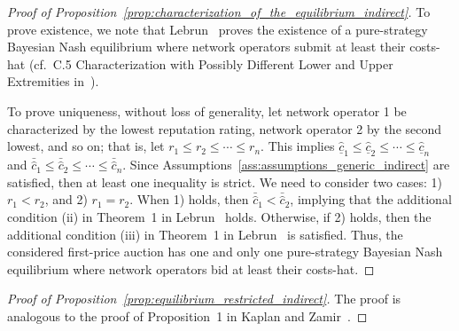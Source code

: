 \begin{proof}[Proof of Proposition~\ref{prop:characterization_of_the_equilibrium_indirect}]
To prove existence, we note that Lebrun~\cite{Lebrun2006} proves the existence of a pure-strategy Bayesian Nash equilibrium where network operators submit at least their costs-hat (cf.~C.5 Characterization with Possibly Different Lower and Upper Extremities in~\cite{Lebrun2006}).

To prove uniqueness, without loss of generality, let network operator 1 be characterized by the lowest reputation rating, network operator 2 by the second lowest, and so on; that is, let $r_1 \leq r_2 \leq\cdots \leq r_n$. This implies $\underline{\hat{c}}_1 \leq \underline{\hat{c}}_2 \leq\cdots \leq \underline{\hat{c}}_n$ and $\bar{\hat{c}}_1 \leq \bar{\hat{c}}_2 \leq \cdots\leq \bar{\hat{c}}_n$. Since Assumptions~\ref{ass:assumptions_generic_indirect} are satisfied, then at least one inequality is strict. We need to consider two cases: 1) $r_1 < r_2$, and 2) $r_1 = r_2$. When 1) holds, then $\bar{\hat{c}}_1 < \bar{\hat{c}}_2$, implying that the additional condition (ii) in Theorem~1 in Lebrun~\cite{Lebrun2006} holds. Otherwise, if 2) holds, then the additional condition (iii) in Theorem~1 in Lebrun~\cite{Lebrun2006} is satisfied. Thus, the considered first-price auction has one and only one pure-strategy Bayesian Nash equilibrium where network operators bid at least their costs-hat.
\end{proof}

\begin{proof}[Proof of Proposition~\ref{prop:equilibrium_restricted_indirect}]
The proof is analogous to the proof of Proposition~1 in Kaplan and Zamir~\cite{KaplanZamir2007}.
\end{proof}
